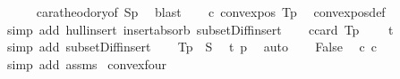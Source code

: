 \begin{isabellebody}
\ \ \ \ \isamarkupfalse%
\ caratheodory{\isacharbrackleft}{\kern0pt}of\ {\isachardoublequoteopen}S{\isacharminus}{\kern0pt}{\isacharbraceleft}{\kern0pt}p{\isacharbraceright}{\kern0pt}{\isachardoublequoteclose}{\isacharbrackright}{\kern0pt}\ \isamarkupfalse%
\ blast\isanewline
\ \ \isamarkupfalse%
\ c{}{\isacharcolon}{\kern0pt}{\isachardoublequoteopen}{\isasymnot}\ convex{\isacharunderscore}{\kern0pt}pos\ {\isacharparenleft}{\kern0pt}T{\isasymunion}{\isacharbraceleft}{\kern0pt}p{\isacharbraceright}{\kern0pt}{\isacharparenright}{\kern0pt}{\isachardoublequoteclose}\ \isamarkupfalse%
\ convex{\isacharunderscore}{\kern0pt}pos{\isacharunderscore}{\kern0pt}def\isanewline
\ \ \ \ \isamarkupfalse%
\ {\isacharparenleft}{\kern0pt}simp\ add{\isacharcolon}{\kern0pt}\ hull{\isacharunderscore}{\kern0pt}insert\ insert{\isacharunderscore}{\kern0pt}absorb\ subset{\isacharunderscore}{\kern0pt}Diff{\isacharunderscore}{\kern0pt}insert{\isacharparenright}{\kern0pt}\isanewline
\ \ \isamarkupfalse%
\ c{}{\isacharcolon}{\kern0pt}{\isachardoublequoteopen}card\ {\isacharparenleft}{\kern0pt}T{\isasymunion}{\isacharbraceleft}{\kern0pt}p{\isacharbraceright}{\kern0pt}{\isacharparenright}{\kern0pt}\ {\isasymle}\ {}{\isachardoublequoteclose}\ \isamarkupfalse%
\ t\isanewline
\ \ \ \ \isamarkupfalse%
\ {\isacharparenleft}{\kern0pt}simp\ add{\isacharcolon}{\kern0pt}\ subset{\isacharunderscore}{\kern0pt}Diff{\isacharunderscore}{\kern0pt}insert{\isacharparenright}{\kern0pt}\isanewline
\ \ \isamarkupfalse%
\ {\isachardoublequoteopen}T{\isasymunion}{\isacharbraceleft}{\kern0pt}p{\isacharbraceright}{\kern0pt}\ {\isasymsubseteq}\ S{\isachardoublequoteclose}\ \isamarkupfalse%
\ t{\isacharparenleft}{\kern0pt}{}{\isacharparenright}{\kern0pt}\ p{\isacharparenleft}{\kern0pt}{}{\isacharparenright}{\kern0pt}\ \isamarkupfalse%
\ auto\isanewline
\ \ \isamarkupfalse%
\ False\ \isamarkupfalse%
\ c{}\ c{}\isanewline
\ \ \ \ \isamarkupfalse%
\ {\isacharparenleft}{\kern0pt}simp\ add{\isacharcolon}{\kern0pt}\ assms{\isacharparenright}{\kern0pt}\isanewline
{}\isamarkupfalse%
%
\endisatagproof
{\isafoldproof}%
%
\isadelimproof
\isanewline
%
\endisadelimproof
\isanewline
{}\isamarkupfalse%
\ convexfour{\isacharcolon}{\kern0pt}\isanewline

\end{isabellebody}
